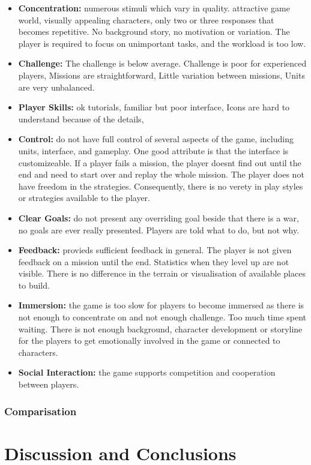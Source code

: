        \begin{itemize}
        \item {\bf Concentration:} numerous stimuli which vary in quality. attractive game world, visually appealing characters, only two or three responses that becomes repetitive. No background story, no motivation or variation. The player is required to focus on unimportant tasks, and the workload is too low. 
        \item {\bf Challenge:} The challenge is below average. Challenge is poor for experienced players, Missions are straightforward, Little variation between missions, Units are very unbalanced. 
        \item {\bf Player Skills:} ok tutorials, familiar but poor interface, Icons are hard to understand because of the details, 
        \item {\bf Control:} do not have full control of several aspects of the game, including units, interface, and gameplay. One good attribute is that the interface is customizeable. If a player fails a mission, the player doesnt find out until the end and need to start over and replay the whole mission. The player does not have freedom in the strategies. Consequently, there is no verety in play styles or strategies available to the player. 
        \item {\bf Clear Goals:} do not present any overriding goal beside that there is a war, no goals are ever really presented. Players are told what to do, but not why. 
        \item {\bf Feedback:} provieds sufficient feedback in general. The player is not given feedback on a mission until the end. Statistics when they level up are not visible. There is no difference in the terrain or visualisation of available places to build. 
        \item {\bf Immersion:} the game is too slow for players to become immersed as there is not enough to concentrate on and not enough challenge. Too much time spent waiting. There is not enough background, character development or storyline for the players to get emotionally involved in the game or connected to characters. 
        \item {\bf Social Interaction:} the game supports competition and cooperation between players. 
      \end{itemize}

    \subsubsection*{Comparisation}


  \section*{Discussion and Conclusions}